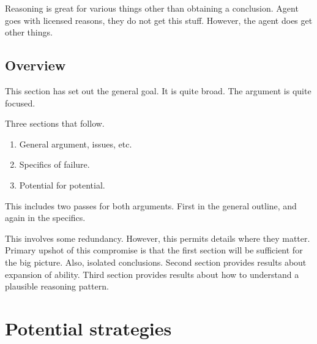 \documentclass[10pt]{article}
\newcommand{\hozlinedash}[0]{%
  \noindent\hdashrule[0.5ex][c]{\textwidth}{.1pt}{2.5pt}
}
\begin{document}
Reasoning is great for various things other than obtaining a conclusion.
Agent goes with licensed reasons, they do not get this stuff.
However, the agent does get other things.

\subsection{Overview}
\label{sec:overview}

This section has set out the general goal.
It is quite broad.
The argument is quite focused.

Three sections that follow.
\begin{enumerate}
\item General argument, issues, etc.
\item Specifics of failure.
\item Potential for potential.
\end{enumerate}
This includes two passes for both arguments.
First in the general outline, and again in the specifics.

This involves some redundancy.
However, this permits details where they matter.
Primary upshot of this compromise is that the first section will be sufficient for the big picture.
Also, isolated conclusions.
Second section provides results about expansion of ability.
Third section provides results about how to understand a plausible reasoning pattern.


\hozlinedash

\section{Potential strategies}
\label{sec:potential-strategies}
\end{document}
